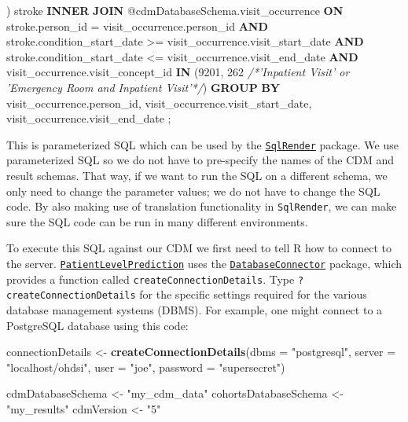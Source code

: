 \documentclass[]{book}
\newenvironment{Shaded}{\begin{snugshade}}{\end{snugshade}}
\newcommand{\KeywordTok}[1]{\textcolor[rgb]{0.13,0.29,0.53}{\textbf{#1}}}
\newcommand{\DataTypeTok}[1]{\textcolor[rgb]{0.13,0.29,0.53}{#1}}
\newcommand{\DecValTok}[1]{\textcolor[rgb]{0.00,0.00,0.81}{#1}}
\newcommand{\StringTok}[1]{\textcolor[rgb]{0.31,0.60,0.02}{#1}}
\newcommand{\CommentTok}[1]{\textcolor[rgb]{0.56,0.35,0.01}{\textit{#1}}}
\newcommand{\NormalTok}[1]{#1}
\begin{document}
\begin{Shaded}
\begin{Highlighting}[]
\NormalTok{) stroke}
\KeywordTok{INNER} \KeywordTok{JOIN}\NormalTok{ @cdmDatabaseSchema.visit_occurrence}
\KeywordTok{ON}\NormalTok{ stroke.person_id = visit_occurrence.person_id}
\KeywordTok{AND}\NormalTok{ stroke.condition_start_date >= visit_occurrence.visit_start_date}
\KeywordTok{AND}\NormalTok{ stroke.condition_start_date <= visit_occurrence.visit_end_date}
\KeywordTok{AND}\NormalTok{ visit_occurrence.visit_concept_id }\KeywordTok{IN}\NormalTok{ (}\DecValTok{9201}\NormalTok{, }\DecValTok{262} \CommentTok{/*'Inpatient Visit'  or}
\CommentTok{    'Emergency Room and Inpatient Visit'*/}\NormalTok{)}
\KeywordTok{GROUP} \KeywordTok{BY}\NormalTok{ visit_occurrence.person_id, visit_occurrence.visit_start_date,}
\NormalTok{         visit_occurrence.visit_end_date}
\NormalTok{;}
\end{Highlighting}
\end{Shaded}

This is parameterized SQL which can be used by the
\href{http://github.com/OHDSI/SqlRender}{\texttt{SqlRender}} package. We
use parameterized SQL so we do not have to pre-specify the names of the
CDM and result schemas. That way, if we want to run the SQL on a
different schema, we only need to change the parameter values; we do not
have to change the SQL code. By also making use of translation
functionality in \texttt{SqlRender}, we can make sure the SQL code can
be run in many different environments.

To execute this SQL against our CDM we first need to tell R how to
connect to the server.
\href{http://github.com/OHDSI/PatientLevelPrediction}{\texttt{PatientLevelPrediction}}
uses the
\href{http://github.com/ohdsi/DatabaseConnector}{\texttt{DatabaseConnector}}
package, which provides a function called
\texttt{createConnectionDetails}. Type \texttt{?createConnectionDetails}
for the specific settings required for the various database management
systems (DBMS). For example, one might connect to a PostgreSQL database
using this code:

\begin{Shaded}
\begin{Highlighting}[]
\NormalTok{connectionDetails <-}\StringTok{ }\KeywordTok{createConnectionDetails}\NormalTok{(}\DataTypeTok{dbms =} \StringTok{"postgresql"}\NormalTok{,}
                                             \DataTypeTok{server =} \StringTok{"localhost/ohdsi"}\NormalTok{,}
                                             \DataTypeTok{user =} \StringTok{"joe"}\NormalTok{,}
                                             \DataTypeTok{password =} \StringTok{"supersecret"}\NormalTok{)}

\NormalTok{cdmDatabaseSchema <-}\StringTok{ "my_cdm_data"}
\NormalTok{cohortsDatabaseSchema <-}\StringTok{ "my_results"}
\NormalTok{cdmVersion <-}\StringTok{ "5"}
\end{Highlighting}
\end{Shaded}
\end{document}
